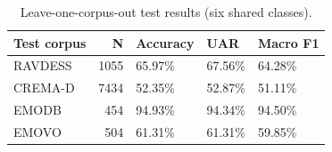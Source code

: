 \begin{table}
\caption{Leave-one-corpus-out test results (six shared classes).}
\label{tab:arch_a_loco}
\begin{tabular}{lrlll}
\toprule
Test corpus & N & Accuracy & UAR & Macro F1 \\
\midrule
RAVDESS & 1055 & 65.97\% & 67.56\% & 64.28\% \\
CREMA-D & 7434 & 52.35\% & 52.87\% & 51.11\% \\
EMODB & 454 & 94.93\% & 94.34\% & 94.50\% \\
EMOVO & 504 & 61.31\% & 61.31\% & 59.85\% \\
\bottomrule
\end{tabular}
\end{table}
